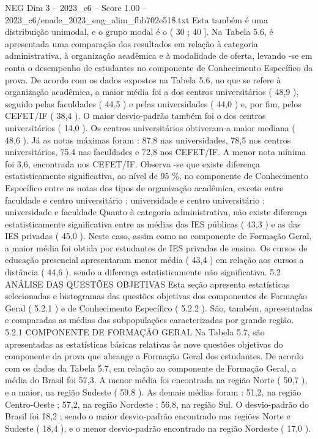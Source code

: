 \begin{textsample}{NEG Dim 3 – 2023\_c6 – Score 1.00 – 2023\_c6/enade\_2023\_eng\_alim\_fbb702e518.txt}
Esta também é uma distribuição unimodal, e o grupo modal é o ( 30 ; 40 ].
Na Tabela 5.6, é apresentada uma comparação dos resultados em relação à categoria administrativa, à organização acadêmica e à modalidade de oferta, levando -se em conta o desempenho de estudantes no componente de Conhecimento Específico da prova.
De acordo com os dados expostos na Tabela 5.6, no que se refere à organização acadêmica, a maior média foi a dos centros universitários ( 48,9 ), seguido pelas faculdades ( 44,5 ) e pelas universidades ( 44,0 ) e, por fim, pelos CEFET/IF ( 38,4 ).
O maior desvio-padrão também foi o dos centros universitários ( 14,0 ).
Os centros universitários obtiveram a maior mediana ( 48,6 ).
Já as notas máximas foram : 87,8 nas universidades, 78,5 nos centros universitários, 75,4 nas faculdades e 72,8 nos CEFET/IF.
A menor nota mínima foi 3,6, encontrada nos CEFET/IF.
Observa -se que existe diferença estatisticamente significativa, ao nível de 95 \%, no componente de Conhecimento Específico entre as notas dos tipos de organização acadêmica, exceto entre faculdade e centro universitário ; universidade e centro universitário ; universidade e faculdade Quanto à categoria administrativa, não existe diferença estatisticamente significativa entre as médias das IES públicas ( 43,3 ) e as das IES privadas ( 45,0 ).
Neste caso, assim como no componente de Formação Geral, a maior média foi obtida por estudantes de IES privadas de ensino.
Os cursos de educação presencial apresentaram menor média ( 43,4 ) em relação aos cursos a distância ( 44,6 ), sendo a diferença estatisticamente não significativa. 5.2 ANÁLISE DAS QUESTÕES OBJETIVAS Esta seção apresenta estatísticas selecionadas e histogramas das questões objetivas dos componentes de Formação Geral ( 5.2.1 ) e de Conhecimento Específico ( 5.2.2 ).
São, também, apresentadas e comparadas as médias das subpopulações caracterizadas por grande região. 5.2.1 COMPONENTE DE FORMAÇÃO GERAL Na Tabela 5.7, são apresentadas as estatísticas básicas relativas às nove questões objetivas do componente da prova que abrange a Formação Geral dos estudantes.
De acordo com os dados da Tabela 5.7, em relação ao componente de Formação Geral, a média do Brasil foi 57,3.
A menor média foi encontrada na região Norte ( 50,7 ), e a maior, na região Sudeste ( 59,8 ).
As demais médias foram : 51,2, na região Centro-Oeste ; 57,2, na região Nordeste ; 56,8, na região Sul.
O desvio-padrão do Brasil foi 18,2 ; sendo o maior desvio-padrão encontrado nas regiões Norte e Sudeste ( 18,4 ), e o menor desvio-padrão encontrado na região Nordeste ( 17,0 ).

\end{textsample}
